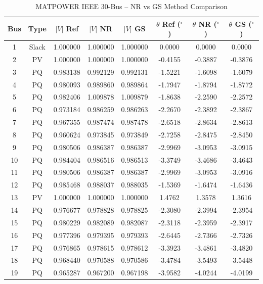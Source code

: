 \documentclass[12pt,a4paper]{article}
\begin{document}
\begin{table}[H]
\centering
\caption{MATPOWER IEEE 30-Bus -- NR vs GS Method Comparison}
\footnotesize
\begin{tabular}{cccccccc}
\toprule
\textbf{Bus} & \textbf{Type} & \textbf{$|V|$ Ref} & \textbf{$|V|$ NR} & \textbf{$|V|$ GS} & \textbf{$\theta$ Ref ($^\circ$)} & \textbf{$\theta$ NR ($^\circ$)} & \textbf{$\theta$ GS ($^\circ$)} \\
\midrule
1  & Slack & 1.000000 & 1.000000 & 1.000000 &  0.0000 &  0.0000 &  0.0000 \\
2  & PV    & 1.000000 & 1.000000 & 1.000000 & -0.4155 & -0.3887 & -0.3876 \\
3  & PQ    & 0.983138 & 0.992129 & 0.992131 & -1.5221 & -1.6098 & -1.6079 \\
4  & PQ    & 0.980093 & 0.989860 & 0.989864 & -1.7947 & -1.8794 & -1.8772 \\
5  & PQ    & 0.982406 & 1.009878 & 1.009879 & -1.8638 & -2.2590 & -2.2572 \\
6  & PQ    & 0.973184 & 0.986259 & 0.986263 & -2.2670 & -2.3892 & -2.3867 \\
7  & PQ    & 0.967355 & 0.987474 & 0.987478 & -2.6518 & -2.8634 & -2.8613 \\
8  & PQ    & 0.960624 & 0.973845 & 0.973849 & -2.7258 & -2.8475 & -2.8450 \\
9  & PQ    & 0.980506 & 0.986387 & 0.986387 & -2.9969 & -3.0953 & -3.0915 \\
10 & PQ    & 0.984404 & 0.986516 & 0.986513 & -3.3749 & -3.4686 & -3.4643 \\
11 & PQ    & 0.980506 & 0.986387 & 0.986387 & -2.9969 & -3.0953 & -3.0916 \\
12 & PQ    & 0.985468 & 0.988037 & 0.988035 & -1.5369 & -1.6474 & -1.6436 \\
13 & PV    & 1.000000 & 1.000000 & 1.000000 &  1.4762 &  1.3578 &  1.3616 \\
14 & PQ    & 0.976677 & 0.978828 & 0.978825 & -2.3080 & -2.3994 & -2.3954 \\
15 & PQ    & 0.980229 & 0.982089 & 0.982087 & -2.3118 & -2.3959 & -2.3917 \\
16 & PQ    & 0.977396 & 0.979395 & 0.979393 & -2.6445 & -2.7366 & -2.7326 \\
17 & PQ    & 0.976865 & 0.978615 & 0.978612 & -3.3923 & -3.4861 & -3.4820 \\
18 & PQ    & 0.968440 & 0.970588 & 0.970586 & -3.4784 & -3.5493 & -3.5448 \\
19 & PQ    & 0.965287 & 0.967200 & 0.967198 & -3.9582 & -4.0244 & -4.0199 \\

\end{tabular}
\end{table}
\end{document}
